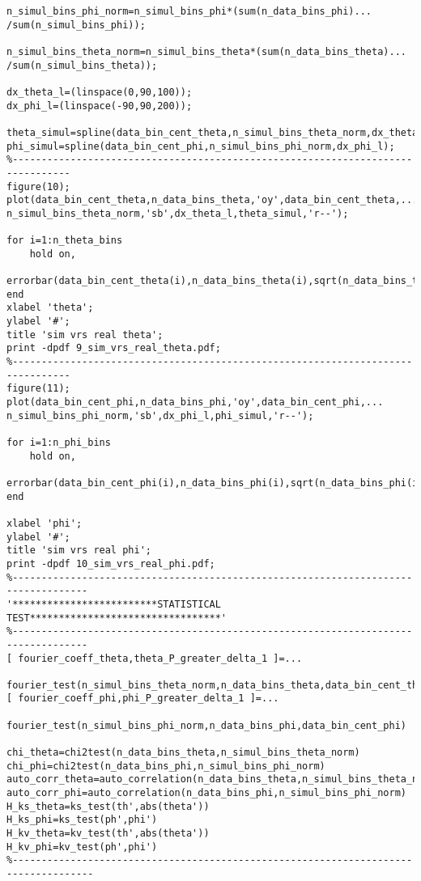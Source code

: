 \begin{verbatim}
n_simul_bins_phi_norm=n_simul_bins_phi*(sum(n_data_bins_phi)...
/sum(n_simul_bins_phi));

n_simul_bins_theta_norm=n_simul_bins_theta*(sum(n_data_bins_theta)...
/sum(n_simul_bins_theta));

dx_theta_l=(linspace(0,90,100));
dx_phi_l=(linspace(-90,90,200));

theta_simul=spline(data_bin_cent_theta,n_simul_bins_theta_norm,dx_theta_l);
phi_simul=spline(data_bin_cent_phi,n_simul_bins_phi_norm,dx_phi_l);
%--------------------------------------------------------------------------------
figure(10);
plot(data_bin_cent_theta,n_data_bins_theta,'oy',data_bin_cent_theta,...
n_simul_bins_theta_norm,'sb',dx_theta_l,theta_simul,'r--');

for i=1:n_theta_bins
    hold on,   
    errorbar(data_bin_cent_theta(i),n_data_bins_theta(i),sqrt(n_data_bins_theta(i)))
end
xlabel 'theta';
ylabel '#';
title 'sim vrs real theta';
print -dpdf 9_sim_vrs_real_theta.pdf;
%--------------------------------------------------------------------------------
figure(11);
plot(data_bin_cent_phi,n_data_bins_phi,'oy',data_bin_cent_phi,...
n_simul_bins_phi_norm,'sb',dx_phi_l,phi_simul,'r--');

for i=1:n_phi_bins
    hold on,   
    errorbar(data_bin_cent_phi(i),n_data_bins_phi(i),sqrt(n_data_bins_phi(i)))
end

xlabel 'phi';
ylabel '#';
title 'sim vrs real phi';
print -dpdf 10_sim_vrs_real_phi.pdf;
%-----------------------------------------------------------------------------------
'*************************STATISTICAL TEST*********************************'
%-----------------------------------------------------------------------------------
[ fourier_coeff_theta,theta_P_greater_delta_1 ]=...
    fourier_test(n_simul_bins_theta_norm,n_data_bins_theta,data_bin_cent_theta)
[ fourier_coeff_phi,phi_P_greater_delta_1 ]=...
    fourier_test(n_simul_bins_phi_norm,n_data_bins_phi,data_bin_cent_phi)

chi_theta=chi2test(n_data_bins_theta,n_simul_bins_theta_norm)
chi_phi=chi2test(n_data_bins_phi,n_simul_bins_phi_norm)
auto_corr_theta=auto_correlation(n_data_bins_theta,n_simul_bins_theta_norm)
auto_corr_phi=auto_correlation(n_data_bins_phi,n_simul_bins_phi_norm)
H_ks_theta=ks_test(th',abs(theta'))
H_ks_phi=ks_test(ph',phi')
H_kv_theta=kv_test(th',abs(theta'))
H_kv_phi=kv_test(ph',phi')
%------------------------------------------------------------------------------------
\end{verbatim}
\pagebreak
